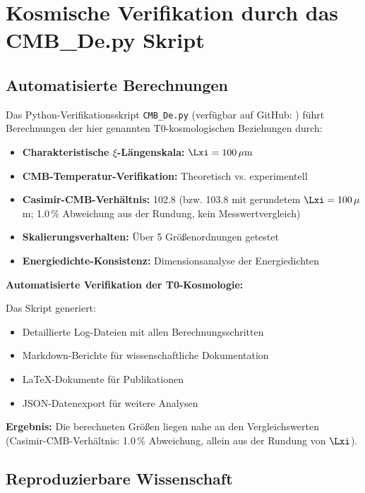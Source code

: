 	\section{Kosmische Verifikation durch das CMB\_De.py Skript}
	
	\subsection{Automatisierte Berechnungen}
	
	Das Python-Verifikationsskript \texttt{CMB\_De.py} (verfügbar auf GitHub: ) führt Berechnungen der hier genannten T0-kosmologischen Beziehungen durch:
	
	\begin{itemize}
		\item \textbf{Charakteristische $\xi$-Längenskala:} $\Lxi = 100\,\mu\text{m}$
		\item \textbf{CMB-Temperatur-Verifikation:} Theoretisch vs. experimentell
		\item \textbf{Casimir-CMB-Verhältnis:} 102.8 (bzw. 103.8 mit gerundetem $\Lxi = 100\,\mu$m; 1.0\,\% Abweichung aus der Rundung, kein Messwertvergleich)
		\item \textbf{Skalierungsverhalten:} Über 5 Größenordnungen getestet
		\item \textbf{Energiedichte-Konsistenz:} Dimensionsanalyse der Energiedichten
	\end{itemize}
	
	\begin{experiment}
		\textbf{Automatisierte Verifikation der T0-Kosmologie:}
		
		Das Skript generiert:
		\begin{itemize}
			\item Detaillierte Log-Dateien mit allen Berechnungsschritten
			\item Markdown-Berichte für wissenschaftliche Dokumentation
			\item LaTeX-Dokumente für Publikationen
			\item JSON-Datenexport für weitere Analysen
		\end{itemize}
		
		\textbf{Ergebnis:} Die berechneten Größen liegen nahe an den Vergleichswerten (Casimir-CMB-Verhältnis: 1.0\,\% Abweichung, allein aus der Rundung von $\Lxi$).
	\end{experiment}
	
	\subsection{Reproduzierbare Wissenschaft}
	

